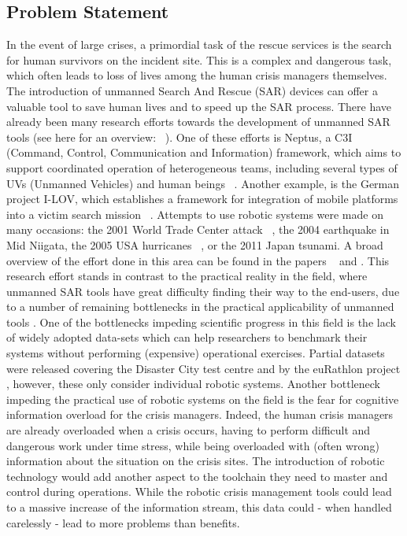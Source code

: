 \documentclass{article}
\begin{document}
\subsection{Problem Statement}
In the event of large crises, a primordial task of the rescue services is the search for human survivors on the incident site.
This is a complex and dangerous task, which often leads to loss of lives among the human crisis managers themselves.
The introduction of unmanned Search And Rescue (SAR) devices can offer a valuable tool to save human lives and to speed up the SAR process.
There have already been many research efforts towards the development of unmanned SAR tools (see here for an overview: ~\cite{kruijff2012}).
One of these efforts is Neptus, a C3I (Command, Control, Communication and Information) framework, which aims to support coordinated operation of heterogeneous teams, including several types of UVs (Unmanned Vehicles) and human beings ~\cite{conf/icra/DiasGPGSP06}.
Another example, is the German project I-LOV, which establishes a framework for integration of mobile platforms into a victim search mission ~\cite{journals/ar/HampGLNPHKR13}.
Attempts to use robotic systems were made on many occasions: the 2001 World Trade Center attack ~\cite{murphy}, the 2004 earthquake in Mid Niigata, the 2005 USA hurricanes ~\cite{reference/robo/MurphyTNJFCE08}, or the 2011 Japan tsunami. A broad overview of the effort done in this area can be found in the papers ~\cite{liu} and \cite{journals/ar/HampGLNPHKR13}.
This research effort stands in contrast to the practical reality in the field, where unmanned SAR tools have great difficulty finding their way to the end-users, due to a number of remaining bottlenecks in the practical applicability of unmanned tools \cite{doroftei}.
One of the bottlenecks impeding scientific progress in this field is the lack of widely adopted data-sets which can help researchers to benchmark their systems without performing (expensive) operational exercises.
Partial datasets were released covering the Disaster City test centre \cite{DisasterCity} and by the euRathlon project \cite{eurathlon}, however, these only consider individual robotic systems. Another bottleneck impeding the practical use of robotic systems on the field is the fear for cognitive information overload for the crisis managers. Indeed, the human crisis managers are already overloaded when a crisis occurs, having to perform difficult and dangerous work under time stress, while being overloaded with (often wrong) information about the situation on the crisis sites. The introduction of robotic technology would add another aspect to the toolchain they need to master and control during operations. While the robotic crisis management tools could lead to a massive increase of the information stream, this data could - when handled carelessly - lead to more problems than benefits.
\end{document}
